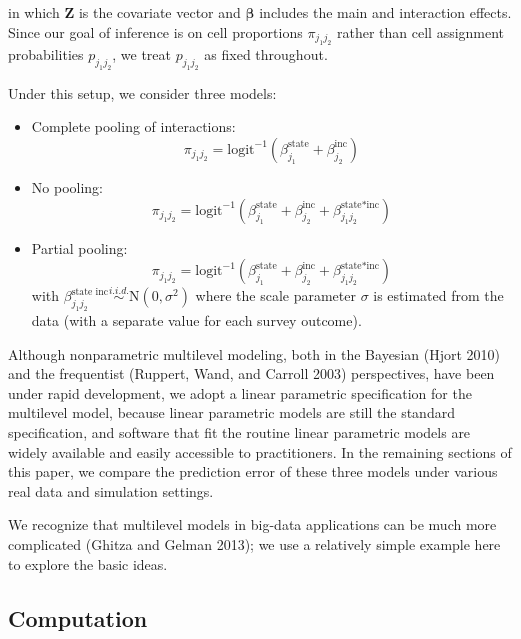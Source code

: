 \documentclass[11pt,article,oneside]{memoir}
\begin{document}
\noindent in which \(\bm Z\) is the covariate vector and \(\bm\beta\)
includes the main and interaction effects. Since our goal of inference
is on cell proportions \(\pi_{j_1j_2}\) rather than cell assignment
probabilities \(p_{j_1j_2}\), we treat \(p_{j_1j_2}\) as fixed
throughout.

Under this setup, we consider three models:

\begin{itemize}
\item Complete pooling of interactions:
\begin{equation*}    \pi_{j_1j_2}=\text{logit}^{-1}\left(\beta^{\text{state}}_{j_1}+\beta^{\text{inc}}_{j_2}\right)\end{equation*}
\item
  No pooling:
\begin{equation*}    \pi_{j_1j_2}=\text{logit}^{-1}\left(\beta^{\text{state}}_{j_1}+\beta^{\text{inc}}_{j_2}+\beta^{\text{state*inc}}_{j_1j_2}\right)\end{equation*}

\item
  Partial pooling:
  \begin{equation*}  \pi_{j_1j_2}=\text{logit}^{-1}\left(\beta^{\text{state}}_{j_1}+\beta^{\text{inc}}_{j_2}+\beta^{\text{state*inc}}_{j_1j_2}\right) \end{equation*} with
    $\beta^{\text{state inc}}_{j_1j_2}\stackrel{i.i.d.}{\sim} \mbox{N}(0,\sigma^2)$
   \noindent where the scale parameter $\sigma$ is estimated from the data (with a separate value for each survey outcome).
\end{itemize}

Although nonparametric multilevel modeling, both in the Bayesian (Hjort
2010) and the frequentist (Ruppert, Wand, and Carroll 2003)
perspectives, have been under rapid development, we adopt a linear
parametric specification for the multilevel model, because linear
parametric models are still the standard specification, and software
that fit the routine linear parametric models are widely available and
easily accessible to practitioners. In the remaining sections of this
paper, we compare the prediction error of these three models under
various real data and simulation settings.

We recognize that multilevel models in big-data applications can be much
more complicated (Ghitza and Gelman 2013); we use a relatively simple
example here to explore the basic ideas.

\subsection{Computation}\label{computation}
\end{document}
